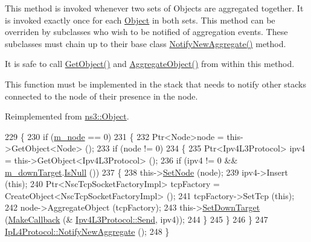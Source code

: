 This method is invoked whenever two sets of Objects are aggregated together. It is invoked exactly once for each \hyperlink{classns3_1_1Object}{Object} in both sets. This method can be overriden by subclasses who wish to be notified of aggregation events. These subclasses must chain up to their base class \hyperlink{classns3_1_1NscTcpL4Protocol_a423e33bc38d6f04ba6c54f7ce2647565}{Notify\+New\+Aggregate()} method.

It is safe to call \hyperlink{classns3_1_1Object_a13e18c00017096c8381eb651d5bd0783}{Get\+Object()} and \hyperlink{classns3_1_1Object_a79dd435d300f3deca814553f561a2922}{Aggregate\+Object()} from within this method.

This function must be implemented in the stack that needs to notify other stacks connected to the node of their presence in the node. 

Reimplemented from \hyperlink{classns3_1_1Object_a1bd7211125185a6cd511c35fea4e500f}{ns3\+::\+Object}.


\begin{DoxyCode}
229 \{ 
230   \textcolor{keywordflow}{if} (\hyperlink{classns3_1_1NscTcpL4Protocol_a1a7121d0e0f775582e6b01a3e7bc1a6c}{m\_node} == 0)
231     \{
232       Ptr<Node>node = this->GetObject<Node> ();
233       \textcolor{keywordflow}{if} (node != 0)
234         \{
235           Ptr<Ipv4L3Protocol> ipv4 = this->GetObject<Ipv4L3Protocol> ();
236           \textcolor{keywordflow}{if} (ipv4 != 0 && \hyperlink{classns3_1_1NscTcpL4Protocol_a83227e4d5dbb352bb29edf0ee48a026e}{m\_downTarget}.\hyperlink{classns3_1_1Callback_aa8e27826badbf37f84763f36f70d9b54}{IsNull} ())
237             \{
238               this->\hyperlink{classns3_1_1NscTcpL4Protocol_a4ed1c16d77da3bc0154c71f623a0f445}{SetNode} (node);
239               ipv4->Insert (\textcolor{keyword}{this});
240               Ptr<NscTcpSocketFactoryImpl> tcpFactory = CreateObject<NscTcpSocketFactoryImpl> ();
241               tcpFactory->SetTcp (\textcolor{keyword}{this});
242               node->AggregateObject (tcpFactory);
243               this->\hyperlink{classns3_1_1NscTcpL4Protocol_afd0f881f664dde5aa7078186760eb010}{SetDownTarget} (\hyperlink{group__makecallbackmemptr_ga9376283685aa99d204048d6a4b7610a4}{MakeCallback} (&
      \hyperlink{classns3_1_1Ipv4L3Protocol_abe8cf785815f3fbb32b0e21d629be641}{Ipv4L3Protocol::Send}, ipv4));
244             \}
245         \}
246     \}
247   \hyperlink{classns3_1_1Object_a1bd7211125185a6cd511c35fea4e500f}{IpL4Protocol::NotifyNewAggregate} ();
248 \}
\end{DoxyCode}


